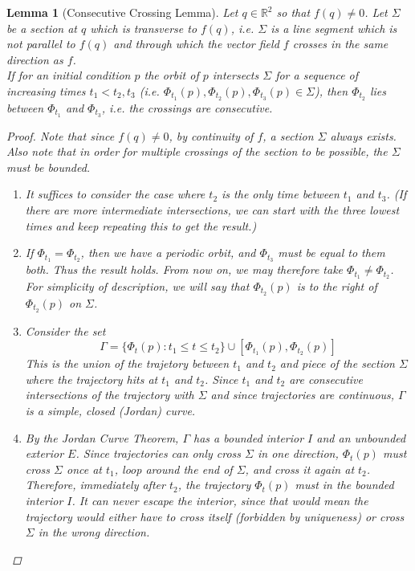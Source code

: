 \documentclass{article}
\newtheorem{lemma}[theorem]{Lemma}
\def\R{{\mathbb R}}
\begin{document}
\begin{lemma}[Consecutive Crossing Lemma]Let $q \in \R^2$ so that $f(q) \neq 0$. Let $\Sigma$ be a section at $q$ which is transverse to $f(q)$, i.e. $\Sigma$ is a line segment which is not parallel to $f(q)$ and through which the vector field $f$ crosses in the same direction as $f$.\\

If for an initial condition $p$ the orbit of $p$ intersects $\Sigma$ for a sequence of increasing times $t_1 < t_2, t_3$ (i.e. $\Phi_{t_1}(p), \Phi_{t_2}(p), \Phi_{t_3}(p) \in \Sigma$), then $\Phi_{t_2}$ lies between $\Phi_{t_1}$ and $\Phi_{t_3}$, i.e. the crossings are consecutive.\\

\begin{proof}

Note that since $f(q) \neq 0$, by continuity of $f$, a section $\Sigma$ always exists. Also note that in order for multiple crossings of the section to be possible, the $\Sigma$ must be bounded.
\begin{enumerate}
\item It suffices to consider the case where $t_2$ is the only time between $t_1$ and $t_3$. (If there are more intermediate intersections, we can start with the three lowest times and keep repeating this to get the result.)

\item If $\Phi_{t_1} = \Phi_{t_2}$, then we have a periodic orbit, and $\Phi_{t_3}$ must be equal to them both. Thus the result holds. From now on, we may therefore take $\Phi_{t_1} \neq \Phi_{t_2}$. For simplicity of description, we will say that $\Phi_{t_2}(p)$ is to the right of $\Phi_{t_2}(p)$ on $\Sigma$. 

\item Consider the set
\[
\Gamma = \{ \Phi_t(p) : t_1 \leq t \leq t_2 \} \cup
[\Phi_{t_1}(p), \Phi_{t_2}(p)]
\]
This is the union of the trajetory between $t_1$ and $t_2$ and piece of the section $\Sigma$ where the trajectory hits at $t_1$ and $t_2$. Since $t_1$ and $t_2$ are consecutive intersections of the trajectory with $\Sigma$ and since trajectories are continuous, $\Gamma$ is a simple, closed (Jordan) curve.

\item By the Jordan Curve Theorem, $\Gamma$ has a bounded interior $I$ and an unbounded exterior $E$. Since trajectories can only cross $\Sigma$ in one direction, $\Phi_t(p)$ must cross $\Sigma$ once at $t_1$, loop around the end of $\Sigma$, and cross it again at $t_2$. Therefore, immediately after $t_2$, the trajectory $\Phi_t(p)$ must in the bounded interior $I$. It can never escape the interior, since that would mean the trajectory would either have to cross itself (forbidden by uniqueness) or cross $\Sigma$ in the wrong direction.


\end{enumerate}
\end{proof}
\end{lemma}
\end{document}
